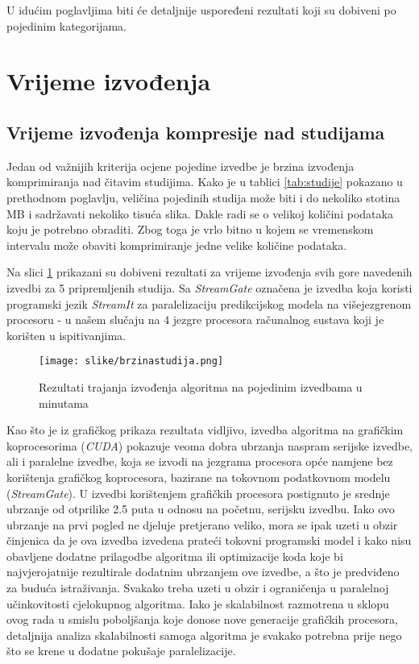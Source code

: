 \documentclass[times, utf8, zavrsni, numeric, sort]{fer}
\begin{document}
U idućim poglavljima biti će detaljnije uspoređeni rezultati koji su dobiveni po pojedinim kategorijama.

\section{Vrijeme izvođenja}

\subsection{Vrijeme izvođenja kompresije nad studijama}

Jedan od važnijih kriterija ocjene pojedine izvedbe je brzina izvođenja komprimiranja nad čitavim studijima. Kako je u tablici \ref{tab:studije} pokazano u prethodnom poglavlju, veličina pojedinih studija može biti i do nekoliko stotina MB i sadržavati nekoliko tisuća slika. Dakle radi se o velikoj količini podataka koju je potrebno obraditi. Zbog toga je vrlo bitno u kojem se vremenskom intervalu može obaviti komprimiranje jedne velike količine podataka.

Na slici \ref{tab:brzinastudija} prikazani su dobiveni rezultati za vrijeme izvođenja svih gore navedenih izvedbi za 5 pripremljenih studija. Sa \emph{StreamGate} označena je izvedba koja koristi programski jezik \emph{StreamIt} za paralelizaciju predikcijskog modela na višejezgrenom procesoru - u našem slučaju na 4 jezgre procesora računalnog sustava koji je korišten u ispitivanjima.

\begin{figure}[htb]
\centering
\texttt{[image: slike/brzinastudija.png]}
\caption{Rezultati trajanja izvođenja algoritma na pojedinim izvedbama u minutama}
\label{tab:brzinastudija}
\end{figure}


Kao što je iz grafičkog prikaza rezultata vidljivo, izvedba algoritma na grafičkim koprocesorima (\emph{CUDA}) pokazuje veoma dobra ubrzanja naspram serijske izvedbe, ali i paralelne izvedbe, koja se izvodi na jezgrama procesora opće namjene bez korištenja grafičkog koprocesora, bazirane na tokovnom podatkovnom modelu (\emph{StreamGate}). U izvedbi korištenjem grafičkih procesora postignuto je srednje ubrzanje od otprilike 2.5 puta u odnosu na početnu, serijsku izvedbu. Iako ovo ubrzanje na prvi pogled ne djeluje pretjerano veliko, mora se ipak uzeti u obzir činjenica da je ova izvedba izvedena prateći tokovni programski model i kako nisu obavljene dodatne prilagodbe algoritma ili optimizacije koda koje bi najvjerojatnije rezultirale dodatnim ubrzanjem ove izvedbe, a što je predviđeno za buduća istraživanja. Svakako treba uzeti u obzir i ograničenja u paralelnoj učinkovitosti cjelokupnog algoritma. Iako je skalabilnost razmotrena u sklopu ovog rada u smislu poboljšanja koje donose nove generacije grafičkih procesora, detaljnija analiza skalabilnosti samoga algoritma je svakako potrebna prije nego što se krene u dodatne pokušaje paralelizacije.
\end{document}
